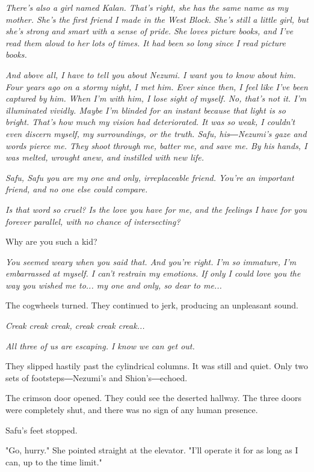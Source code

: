 \emph{There's also a girl named Kalan. That's right, she has the same name as
	my mother. She's the first friend I made in the West Block. She's still
	a little girl, but she's strong and smart with a sense of pride. She
	loves picture books, and I've read them aloud to her lots of times. It
	had been so long since I read picture books.}

\emph{And above all, I have to tell you about Nezumi. I want you to know about
	him. Four years ago on a stormy night, I met him. Ever since then, I
	feel like I've been captured by him. When I'm with him, I lose sight of
	myself. No, that's not it. I'm illuminated vividly. Maybe I'm blinded
	for an instant because that light is so bright. That's how much my
	vision had deteriorated. It was so weak, I couldn't even discern myself,
	my surroundings, or the truth. Safu, his―Nezumi's gaze and words pierce
	me. They shoot through me, batter me, and save me. By his hands, I was
	melted, wrought anew, and instilled with new life.}

\emph{Safu, Safu you are my one and only, irreplaceable friend. You're an
	important friend, and no one else could compare.}

\emph{Is that word so cruel? Is the love you have for me, and the feelings I
	have for you forever parallel, with no chance of intersecting?}

Why are you such a kid?

\emph{You seemed weary when you said that. And you're right. I'm so immature,
	I'm embarrassed at myself. I can't restrain my emotions. If only I could
	love you the way you wished me to... my one and only, so dear to me...}

The cogwheels turned. They continued to jerk, producing an unpleasant
sound.

\emph{Creak creak creak, creak creak creak...}

\emph{All three of us are escaping. I know we can get out.}

They slipped hastily past the cylindrical columns. It was still and
quiet. Only two sets of footsteps―Nezumi's and Shion's―echoed.

The crimson door opened. They could see the deserted hallway. The three
doors were completely shut, and there was no sign of any human presence.

Safu's feet stopped.

"Go, hurry." She pointed straight at the elevator. "I'll operate it for
as long as I can, up to the time limit."

